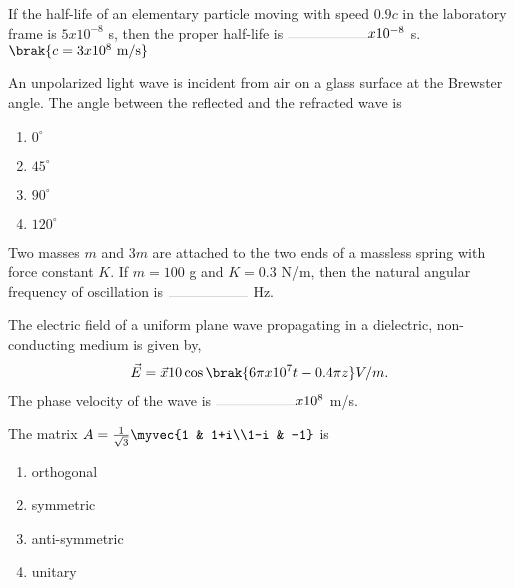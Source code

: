 \iffalse
\chapter{2014}
\author{EE24BTECH11003}
\section{ph}
\fi
\item If the half-life of an elementary particle moving with speed $0.9c$ in the laboratory frame is $5 x 10^{-8}$ s, then the proper half-life is $\rule{2cm}{0.1pt} x 10^{-8}$ s. $\brak{c=3 x 10^8 \text{ m/s}}$
\hfill{}

\item An unpolarized light wave is incident from air on a glass surface at the Brewster angle. The angle between the reflected and the refracted wave is
\hfill{}
\begin{enumerate}
\item $0^{\circ}$
\item $45^{\circ}$
\item $90^{\circ}$
\item $120^{\circ}$
\end{enumerate}

\item Two masses $m$ and $3m$ are attached to the two ends of a massless spring with force constant $K$. If $m=100$ g and $K=0.3$ N/m, then the natural angular frequency of oscillation is $\rule{2cm}{0.1pt}$ Hz.
\hfill{}

\item The electric field of a uniform plane wave propagating in a dielectric, non-conducting medium is given by,
\begin{align*}
\vec{E} = \vec{x}10\cos\brak{6\pi x 10^7t - 0.4\pi z}V/m. 
\end{align*}
The phase velocity of the wave is $\rule{2cm}{0.1pt} x 10^8$ m/s.
\hfill{}

\item The matrix $A = \frac{1}{\sqrt{3}}\myvec{1 & 1+i\\1-i & -1}$ is
\hfill{}
\begin{enumerate}
\item orthogonal
\item symmetric
\item anti-symmetric
\item unitary
\end{enumerate}

